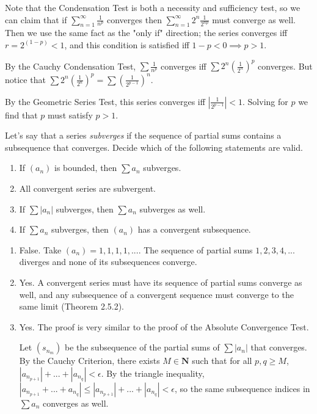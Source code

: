 \documentclass{oxmathproblems}
\begin{document}
\begin{questions}
\begin{solution}
  Note that the Condensation Test is both a necessity and sufficiency test, so we can claim that if $\sum_{n=1}^{\infty} \frac{1}{n^p}$ converges then $\sum_{n=1}^{\infty}2^{n}\frac{1}{2^{np}}$
  must converge as well. Then we use the same fact as the "only if" direction; the series converges iff $r = 2^{(1-p)} < 1$, and this condition is satisfied
  iff $1-p < 0 \implies p > 1$.

  By the Cauchy Condensation Test, $\sum \frac{1}{n^{p}}$ converges iff $\sum 2^{n}(\frac{1}{2^{n}})^{p}$ converges. But notice that
  $\sum 2^{n}(\frac{1}{2^{n}})^{p} = \sum (\frac{1}{2^{p-1}})^{n}$.

  By the Geometric Series Test, this series converges iff $|\frac{1}{2^{p-1}}| < 1$. Solving for $p$ we find that $p$ must satisfy $p > 1$.
\end{solution}

\miquestion Let's say that a series \textit{subverges} if the sequence of partial sums contains a subsequence that converges. Decide which of the following statements are valid.
\begin{enumerate}[label=(\alph*)]
  \item If $(a_{n})$ is bounded, then $\sum a_{n}$ subverges.
  \item All convergent series are subvergent.
  \item If $\sum |a_{n}|$ subverges, then $\sum a_{n}$ subverges as well.
  \item If $\sum a_{n}$ subverges, then $(a_{n})$ has a convergent subsequence.
\end{enumerate}

\begin{solution}
  \begin{enumerate}[label=(\alph*)]
    \item False. Take $(a_{n}) = 1, 1, 1, 1, ...$. The sequence of partial sums $1, 2, 3, 4, ...$ diverges and none of its subsequences converge.
    \item Yes. A convergent series must have its sequence of partial sums converge as well, and any subsequence of a convergent sequence must converge to the same limit (Theorem 2.5.2).
    \item Yes. The proof is very similar to the proof of the Absolute Convergence Test.
    
    Let $(s_{n_{m}})$ be the subsequence of the partial sums of $\sum |a_{n}|$ that converges.
    By the Cauchy Criterion, there exists $M \in \textbf{N}$ such that for all $p, q \geq M$, $|a_{n_{p+1}}| + ... + |a_{n_{q}}| < \epsilon$. By the triangle inequality,
    $|a_{n_{p+1}}+...+a_{n_{q}}| \leq |a_{n_{p+1}}| + ... + |a_{n_{q}}| < \epsilon$, so the same subsequence indices in $\sum a_{n}$ converges as well.


\end{enumerate}
\end{solution}
\end{questions}
\end{document}
